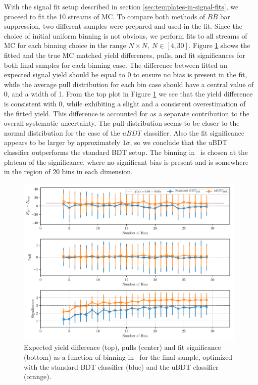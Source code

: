 With the signal fit setup described in section \ref{sec:templates-in-signal-fits}, we proceed to fit the 10 streams of MC. To compare both methods of $B \bar B$ bar suppression, two different samples were prepared and used in the fit. Since the choice of initial uniform binning is not obvious, we perform fits to all streams of MC for each binning choice in the range $N\times N,~N\in[4,30]$. Figure \ref{fig:sig_binning} shows the fitted and the true MC matched yield differences, pulls, and fit significances for both final samples for each binning case. The difference between fitted an expected signal yield should be equal to 0 to ensure no bias is present in the fit, while the average pull distribution for each bin case should have a central value of 0, and a width of 1. From the top plot in Figure \ref{fig:sig_binning} we see that the yield difference is consistent with 0, while exhibiting a slight and a consistent overestimation of the fitted yield. This difference is accounted for as a separate contribution to the overall systematic uncertainty. The pull distribution seems to be closer to the normal distribution for the case of the $uBDT$ classifier. Also the fit significance appears to be larger by approximately $1\sigma$, so we conclude that the uBDT classifier outperforms the standard BDT setup. The binning in \vars~is chosen at the plateau of the significance, where no significant bias is present and is somewhere in the region of $20$ bins in each dimension.

\begin{figure}[H]
	\centering
	\captionsetup{width=0.8\linewidth}
	\includegraphics[width=\linewidth]{fig/sig_binning}
	\caption{Expected yield difference (top), pulls (center) and fit significance (bottom) as a function of binning in \vars~for the final sample, optimized with the standard BDT classifier (blue) and the uBDT classifier (orange).}
	\label{fig:sig_binning}
\end{figure}


